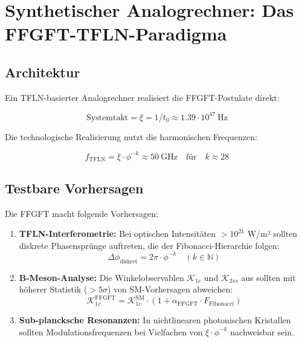 	\section{Synthetischer Analogrechner: Das FFGFT-TFLN-Paradigma}
	
	\subsection{Architektur}
	
	Ein TFLN-basierter Analogrechner realisiert die FFGFT-Postulate direkt:
	
	\begin{equation}
		\text{Systemtakt} = \xi = 1/t_0 \approx 1.39 \cdot 10^{47}~\text{Hz}
	\end{equation}
	
	Die technologische Realisierung nutzt die harmonischen Frequenzen:
	
	\begin{equation}
		f_{\text{TFLN}} = \xi \cdot \phi^{-k} \approx 50~\text{GHz} \quad \text{für} \quad k \approx 28
	\end{equation}
	
	\subsection{Testbare Vorhersagen}
	
	Die FFGFT macht folgende Vorhersagen:
	
	\begin{enumerate}
		\item \textbf{TFLN-Interferometrie:} Bei optischen Intensitäten $>10^{21}$ W/m² sollten diskrete Phasensprünge auftreten, die der Fibonacci-Hierarchie folgen:
		\begin{equation}
			\Delta \phi_{\text{diskret}} = 2\pi \cdot \phi^{-k} \quad (k \in \mathbb{N})
		\end{equation}
		
		\item \textbf{B-Meson-Analyse:} Die Winkelobservablen $\mathcal{K}_{1c}$ und $\mathcal{K}_{2ss}$ aus \cite{Arslan2026} sollten mit höherer Statistik ($>5\sigma$) von SM-Vorhersagen abweichen:
		\begin{equation}
			\mathcal{K}_{1c}^{\text{FFGFT}} = \mathcal{K}_{1c}^{\text{SM}} \cdot (1 + \alpha_{\text{FFGFT}} \cdot F_{\text{Fibonacci}})
		\end{equation}
		
		\item \textbf{Sub-plancksche Resonanzen:} In nichtlinearen photonischen Kristallen sollten Modulationsfrequenzen bei Vielfachen von $\xi \cdot \phi^{-k}$ nachweisbar sein.
	\end{enumerate}
	
